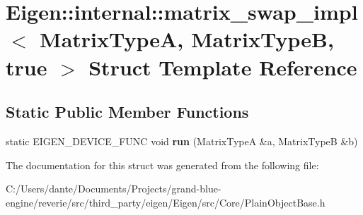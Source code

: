 \hypertarget{struct_eigen_1_1internal_1_1matrix__swap__impl_3_01_matrix_type_a_00_01_matrix_type_b_00_01true_01_4}{}\section{Eigen\+::internal\+::matrix\+\_\+swap\+\_\+impl$<$ Matrix\+TypeA, Matrix\+TypeB, true $>$ Struct Template Reference}
\label{struct_eigen_1_1internal_1_1matrix__swap__impl_3_01_matrix_type_a_00_01_matrix_type_b_00_01true_01_4}
\subsection*{Static Public Member Functions}
\begin{DoxyCompactItemize}
\item 
\mbox{\label{struct_eigen_1_1internal_1_1matrix__swap__impl_3_01_matrix_type_a_00_01_matrix_type_b_00_01true_01_4_a3ec52e3286dacdf734615e55258bbfee}} 
static E\+I\+G\+E\+N\+\_\+\+D\+E\+V\+I\+C\+E\+\_\+\+F\+U\+NC void {\bfseries run} (Matrix\+TypeA \&a, Matrix\+TypeB \&b)
\end{DoxyCompactItemize}


The documentation for this struct was generated from the following file\+:\begin{DoxyCompactItemize}
\item 
C\+:/\+Users/dante/\+Documents/\+Projects/grand-\/blue-\/engine/reverie/src/third\+\_\+party/eigen/\+Eigen/src/\+Core/Plain\+Object\+Base.\+h\end{DoxyCompactItemize}
